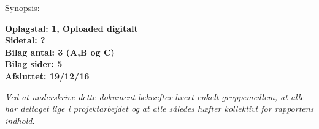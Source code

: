 \hfill
\begin{minipage}[t]{0.483\textwidth}
Synopsis: \\[5pt]
\fbox{\parbox{7cm}{\bigskip\bigskip}}

\vspace*{3cm}

\textbf{Oplagstal: 1, Oploaded digitalt} \\
\textbf{Sidetal: ?} \\
\textbf{Bilag antal: 3 (A,B og C)} \\
\textbf{Bilag sider: 5} \\
\textbf{Afsluttet: 19/12/16}

\end{minipage}
\footnotesize\itshape Ved at underskrive dette dokument bekræfter hvert enkelt gruppemedlem, at alle har deltaget lige i projektarbejdet og at alle således hæfter kollektivt for rapportens indhold.


\vfill



